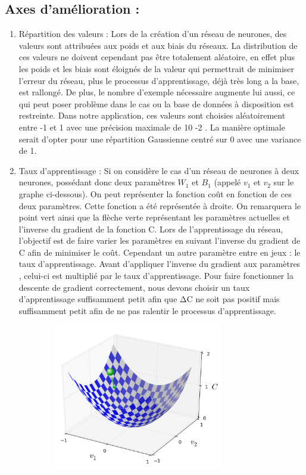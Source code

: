 \documentclass{article}
\begin{document}
\subsection{Axes d'amélioration :}
	\begin{enumerate}
			\item Répartition des valeurs :
			Lors de la création d'un réseau de neurones, des valeurs sont attribuées aux poids et aux biais du réseaux. La distribution de ces valeurs ne doivent cependant pas être totalement aléatoire, en effet plus les poids et les biais sont éloignés de la valeur qui permettrait de minimiser l'erreur du réseau, plus le processus d'apprentissage, déjà très long a la base, est rallongé. 
De plus, le nombre d'exemple nécessaire augmente lui aussi, ce qui peut poser problème dans le cas ou la base de données à disposition est restreinte. 
Dans notre application, ces valeurs sont choisies aléatoirement entre -1 et 1 avec une précision maximale de 10 -2 . La manière optimale serait d'opter pour une répartition Gaussienne centré sur 0 avec une variance de 1.
			\item Taux d'apprentissage :
			Si on considère le cas d'un réseau de neurones à deux neurones, possédant donc deux paramètres
$W_1$ et $B_1$ (appelé $v_1$ et $v_2$ sur le graphe ci-dessous). On peut représenter la fonction coût en fonction de ces
deux paramètres. Cette fonction a été représentée à droite. On remarquera le point vert ainsi que la flèche verte représentant les paramètres actuelles et l'inverse du gradient de la fonction C.
Lors de l'apprentissage du réseau, l'objectif est de faire varier les paramètres en suivant l'inverse du gradient de C afin de minimiser le coût.
Cependant un autre paramètre entre en jeux : le taux d'apprentissage. Avant d'appliquer l'inverse du gradient aux paramètres , celui-ci est multiplié par le taux  d'apprentissage. 
Pour faire fonctionner la descente de gradient correctement, nous devons choisir un taux d'apprentissage suffisamment petit afin que ΔC ne soit pas positif mais suffisamment petit afin de ne pas ralentir le processus d'apprentissage.
				\begin{center} 
					\includegraphics[height=244, width=400]{courbe.png}

\end{center}
\end{enumerate}
\end{document}
